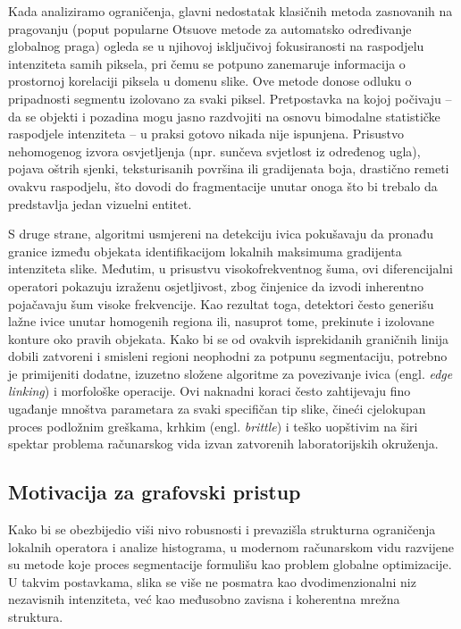 \documentclass[11pt,a4paper]{article}
\begin{document}
Kada analiziramo ograničenja, glavni nedostatak klasičnih metoda zasnovanih na pragovanju (poput popularne Otsuove metode za automatsko određivanje globalnog praga) ogleda se u njihovoj isključivoj fokusiranosti na raspodjelu intenziteta samih piksela, pri čemu se potpuno zanemaruje informacija o prostornoj korelaciji piksela u domenu slike. Ove metode donose odluku o pripadnosti segmentu izolovano za svaki piksel. Pretpostavka na kojoj počivaju – da se objekti i pozadina mogu jasno razdvojiti na osnovu bimodalne statističke raspodjele intenziteta – u praksi gotovo nikada nije ispunjena. Prisustvo nehomogenog izvora osvjetljenja (npr. sunčeva svjetlost iz određenog ugla), pojava oštrih sjenki, teksturisanih površina ili gradijenata boja, drastično remeti ovakvu raspodjelu, što dovodi do fragmentacije unutar onoga što bi trebalo da predstavlja jedan vizuelni entitet. 

S druge strane, algoritmi usmjereni na detekciju ivica pokušavaju da pronađu granice između objekata identifikacijom lokalnih maksimuma gradijenta intenziteta slike. Međutim, u prisustvu visokofrekventnog šuma, ovi diferencijalni operatori pokazuju izraženu osjetljivost, zbog činjenice da izvodi inherentno pojačavaju šum visoke frekvencije. Kao rezultat toga, detektori često generišu lažne ivice unutar homogenih regiona ili, nasuprot tome, prekinute i izolovane konture oko pravih objekata. Kako bi se od ovakvih isprekidanih graničnih linija dobili zatvoreni i smisleni regioni neophodni za potpunu segmentaciju, potrebno je primijeniti dodatne, izuzetno složene algoritme za povezivanje ivica (engl. \textit{edge linking}) i morfološke operacije. Ovi naknadni koraci često zahtijevaju fino ugađanje mnoštva parametara za svaki specifičan tip slike, čineći cjelokupan proces podložnim greškama, krhkim (engl. \textit{brittle}) i teško uopštivim na širi spektar problema računarskog vida izvan zatvorenih laboratorijskih okruženja.

\subsection{Motivacija za grafovski pristup}
Kako bi se obezbijedio viši nivo robusnosti i prevazišla strukturna ograničenja lokalnih operatora i analize histograma, u modernom računarskom vidu razvijene su metode koje proces segmentacije formulišu kao problem globalne optimizacije. U takvim postavkama, slika se više ne posmatra kao dvodimenzionalni niz nezavisnih intenziteta, već kao međusobno zavisna i koherentna mrežna struktura. 
\end{document}
